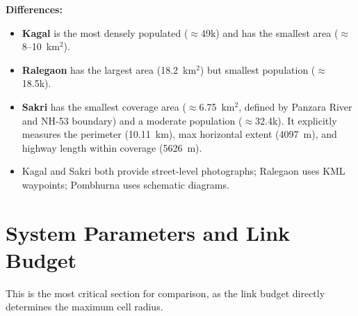\documentclass[11pt,a4paper]{article}
\begin{document}
\noindent\textbf{Differences:}
\begin{itemize}
    \item \textbf{Kagal} is the most densely populated ($\approx$49k) and has the smallest area ($\approx$8--10~km$^2$).
    \item \textbf{Ralegaon} has the largest area (18.2~km$^2$) but smallest population ($\approx$18.5k).
    \item \textbf{Sakri} has the smallest coverage area ($\approx$6.75~km$^2$, defined by Panzara River and NH-53 boundary) and a moderate population ($\approx$32.4k). It explicitly measures the perimeter (10.11~km), max horizontal extent (4097~m), and highway length within coverage (5626~m).
    \item Kagal and Sakri both provide street-level photographs; Ralegaon uses KML waypoints; Pombhurna uses schematic diagrams.
\end{itemize}

\section{System Parameters and Link Budget}
\label{sec:link_budget}

This is the most critical section for comparison, as the link budget directly determines the maximum cell radius.
\end{document}
